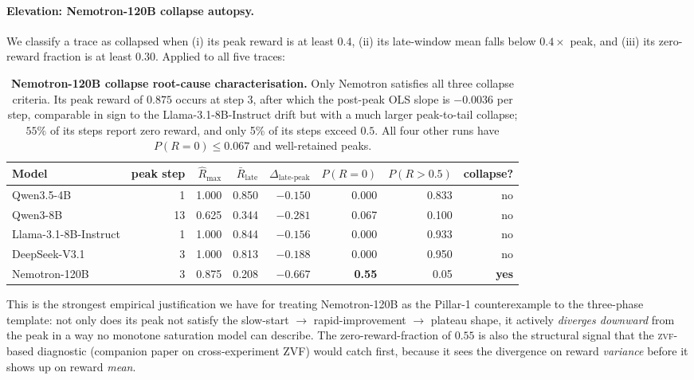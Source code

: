 \paragraph{Elevation: Nemotron-120B collapse autopsy.}
\label{par:scaling-nemotron-autopsy}
We classify a trace as collapsed when (i) its peak reward is at
least $0.4$, (ii) its late-window mean falls below $0.4 \times$
peak, and (iii) its zero-reward fraction is at least $0.30$.
Applied to all five traces:

\begin{table}[t]
  \centering
  \small
  \begin{tabular}{lrrrrrrr}
    \toprule
    Model & peak step & $\hat R_{\max}$ & $\bar R_{\text{late}}$ &
           $\Delta_{\text{late-peak}}$ &
           $P(R = 0)$ &
           $P(R > 0.5)$ & collapse? \\
    \midrule
    Qwen3.5-4B            &  1 & 1.000 & 0.850 & $-0.150$ & 0.000 & 0.833 & no \\
    Qwen3-8B              & 13 & 0.625 & 0.344 & $-0.281$ & 0.067 & 0.100 & no \\
    Llama-3.1-8B-Instruct &  1 & 1.000 & 0.844 & $-0.156$ & 0.000 & 0.933 & no \\
    DeepSeek-V3.1         &  3 & 1.000 & 0.813 & $-0.188$ & 0.000 & 0.950 & no \\
    Nemotron-120B         &  3 & 0.875 & 0.208 & $\mathbf{-0.667}$ & \textbf{0.55} & 0.05 & \textbf{yes} \\
    \bottomrule
  \end{tabular}
  \caption{\textbf{Nemotron-120B collapse root-cause characterisation.}
    Only Nemotron satisfies all three collapse criteria.  Its peak
    reward of $0.875$ occurs at step 3, after which the post-peak
    OLS slope is $-0.0036$ per step, comparable in sign to the
    Llama-3.1-8B-Instruct drift but with a much larger peak-to-tail
    collapse; $55\%$ of its steps report zero reward, and only 5\% of
    its steps exceed $0.5$.  All four other runs have
    $P(R = 0) \le 0.067$ and well-retained peaks.}
  \label{tab:scaling-nemotron-autopsy}
\end{table}

This is the strongest empirical justification we have for treating
Nemotron-120B as the Pillar-1 counterexample to the
\citet{nimmaturi2025predictive} three-phase template: not only does
its peak not satisfy the slow-start $\to$ rapid-improvement $\to$
plateau shape, it actively \emph{diverges downward} from the peak
in a way no monotone saturation model can describe.  The
zero-reward-fraction of $0.55$ is also the structural signal that
the \textsc{zvf}-based diagnostic
(companion paper on cross-experiment ZVF) would catch first, because it
sees the divergence on reward \emph{variance} before it shows up on
reward \emph{mean}.

